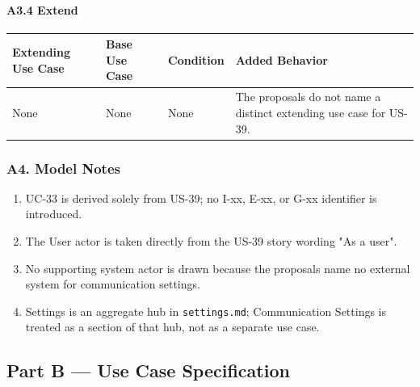 \documentclass[12pt]{article}
\renewcommand{\baselinestretch}{1.5}
\begin{document}
\hypertarget{sec:a3-4-extend}{}
\paragraph*{A3.4 Extend}
\par\medskip

\begingroup
\small
\renewcommand{\baselinestretch}{1.0}\selectfont
\renewcommand{\arraystretch}{1.15}
\setlength{\tabcolsep}{6pt}
\begin{longtable}{|>{\raggedright\arraybackslash}p{}|>{\raggedright\arraybackslash}p{}|>{\raggedright\arraybackslash}p{}|>{\raggedright\arraybackslash}p{}|}
\hline
\textbf{Extending Use Case} & \textbf{Base Use Case} & \textbf{Condition} & \textbf{Added Behavior} \\ \hline
\endhead
None & None & None & The proposals do not name a distinct extending use case for US-39. \\ \hline
\end{longtable}
\endgroup
\par\medskip

\hypertarget{sec:a4-model-notes}{}
\subsubsection*{A4. Model Notes}
\par\medskip

\begin{enumerate}
\item UC-33 is derived solely from US-39; no I-xx, E-xx, or G-xx identifier is introduced.
\item The User actor is taken directly from the US-39 story wording "As a user".
\item No supporting system actor is drawn because the proposals name no external system for communication settings.
\item Settings is an aggregate hub in \texttt{settings.md}; Communication Settings is treated as a section of that hub, not as a separate use case.
\end{enumerate}
\par\medskip

\hypertarget{sec:part-b-use-case-specification}{}
\subsection*{Part B --- Use Case Specification}
\par\medskip
\end{document}

